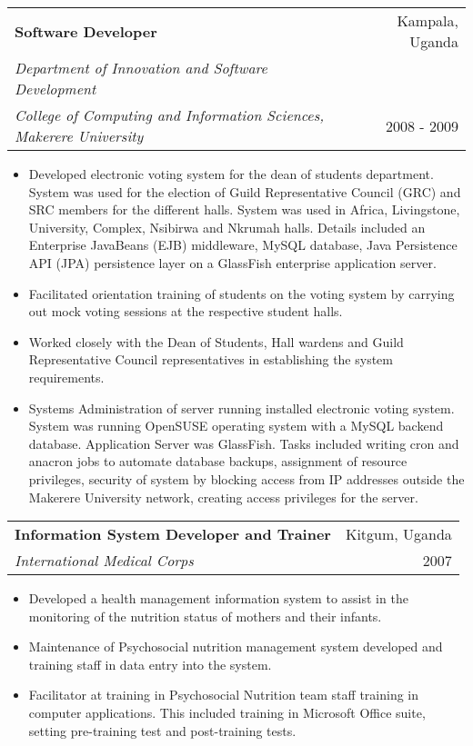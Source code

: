 \documentclass[12pt,a4paper]{article}
\begin{document}
\begin{tabularx}{\textwidth}{ X R }
  \textbf{Software Developer} & Kampala, Uganda\\
  \textit{Department of Innovation and Software Development} \\
  \emph{College of Computing and Information Sciences, Makerere University} & 2008 - 2009\\
\end{tabularx}
  \begin{itemize}
    \item Developed electronic voting system for the dean of students department. System was used for the election of Guild Representative Council (GRC) and SRC members for the different halls. System was used in Africa, Livingstone, University, Complex, Nsibirwa and Nkrumah halls. Details included an Enterprise JavaBeans (EJB) middleware, MySQL database, Java Persistence API (JPA) persistence layer on a GlassFish enterprise application server.
\item Facilitated orientation training of students on the voting system by carrying out mock voting sessions at the respective student halls.
\item Worked closely with the Dean of Students, Hall wardens and Guild Representative Council representatives in establishing the system requirements.
\item Systems Administration of server running installed electronic voting system. System was running OpenSUSE operating system with a MySQL backend database. Application Server was GlassFish. Tasks included writing cron and anacron jobs to automate database backups, assignment of resource privileges, security of system by blocking access from IP addresses outside the Makerere University network, creating access privileges for the server.
  \end{itemize}

\begin{tabularx}{\textwidth}{ X R }
  \textbf{Information System Developer and Trainer} & Kitgum, Uganda\\
  \emph{International Medical Corps} & 2007\\
\end{tabularx}
  \begin{itemize}
    \item Developed a health management information system to assist in the monitoring of the nutrition status of mothers and their infants.
    \item Maintenance of Psychosocial nutrition management system developed and training staff in data entry into the system.
    \item Facilitator at training in Psychosocial Nutrition team staff training in computer applications. This included training in Microsoft Office suite, setting pre-training test and post-training tests.

  \end{itemize}
\end{document}

